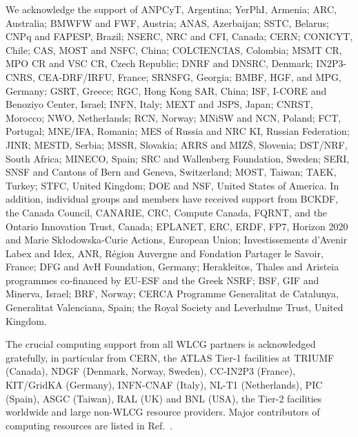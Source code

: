 \documentclass[PAPER, american,coverpage,texlive=2016, english]{\ATLASLATEXPATH atlasdoc}
\begin{document}
We acknowledge the support of ANPCyT, Argentina; YerPhI, Armenia; ARC, Australia; BMWFW and FWF, Austria; ANAS, Azerbaijan; SSTC, Belarus; CNPq and FAPESP, Brazil; NSERC, NRC and CFI, Canada; CERN; CONICYT, Chile; CAS, MOST and NSFC, China; COLCIENCIAS, Colombia; MSMT CR, MPO CR and VSC CR, Czech Republic; DNRF and DNSRC, Denmark; IN2P3-CNRS, CEA-DRF/IRFU, France; SRNSFG, Georgia; BMBF, HGF, and MPG, Germany; GSRT, Greece; RGC, Hong Kong SAR, China; ISF, I-CORE and Benoziyo Center, Israel; INFN, Italy; MEXT and JSPS, Japan; CNRST, Morocco; NWO, Netherlands; RCN, Norway; MNiSW and NCN, Poland; FCT, Portugal; MNE/IFA, Romania; MES of Russia and NRC KI, Russian Federation; JINR; MESTD, Serbia; MSSR, Slovakia; ARRS and MIZ\v{S}, Slovenia; DST/NRF, South Africa; MINECO, Spain; SRC and Wallenberg Foundation, Sweden; SERI, SNSF and Cantons of Bern and Geneva, Switzerland; MOST, Taiwan; TAEK, Turkey; STFC, United Kingdom; DOE and NSF, United States of America. In addition, individual groups and members have received support from BCKDF, the Canada Council, CANARIE, CRC, Compute Canada, FQRNT, and the Ontario Innovation Trust, Canada; EPLANET, ERC, ERDF, FP7, Horizon 2020 and Marie Sk{\l}odowska-Curie Actions, European Union; Investissements d'Avenir Labex and Idex, ANR, R{\'e}gion Auvergne and Fondation Partager le Savoir, France; DFG and AvH Foundation, Germany; Herakleitos, Thales and Aristeia programmes co-financed by EU-ESF and the Greek NSRF; BSF, GIF and Minerva, Israel; BRF, Norway; CERCA Programme Generalitat de Catalunya, Generalitat Valenciana, Spain; the Royal Society and Leverhulme Trust, United Kingdom.

The crucial computing support from all WLCG partners is acknowledged gratefully, in particular from CERN, the ATLAS Tier-1 facilities at TRIUMF (Canada), NDGF (Denmark, Norway, Sweden), CC-IN2P3 (France), KIT/GridKA (Germany), INFN-CNAF (Italy), NL-T1 (Netherlands), PIC (Spain), ASGC (Taiwan), RAL (UK) and BNL (USA), the Tier-2 facilities worldwide and large non-WLCG resource providers. Major contributors of computing resources are listed in Ref.~\cite{ATL-GEN-PUB-2016-002}.




\clearpage
\end{document}
